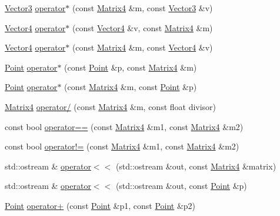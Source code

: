 \begin{DoxyCompactItemize}
\item 
\hyperlink{classprism_1_1_vector3}{Vector3} \hyperlink{namespaceprism_a04f1e6e0f84169fce23b236e0312d6a0}{operator$\ast$} (const \hyperlink{classprism_1_1_matrix4}{Matrix4} \&m, const \hyperlink{classprism_1_1_vector3}{Vector3} \&v)
\item 
\hyperlink{classprism_1_1_vector4}{Vector4} \hyperlink{namespaceprism_a5a10d8ea1e63b19d02bd294e4ebabb1b}{operator$\ast$} (const \hyperlink{classprism_1_1_vector4}{Vector4} \&v, const \hyperlink{classprism_1_1_matrix4}{Matrix4} \&m)
\item 
\hyperlink{classprism_1_1_vector4}{Vector4} \hyperlink{namespaceprism_ad125bd8304d577b6f879fb973f774eb8}{operator$\ast$} (const \hyperlink{classprism_1_1_matrix4}{Matrix4} \&m, const \hyperlink{classprism_1_1_vector4}{Vector4} \&v)
\item 
\hyperlink{classprism_1_1_point}{Point} \hyperlink{namespaceprism_a44373b8bda7131a90d04eef7e455ea6f}{operator$\ast$} (const \hyperlink{classprism_1_1_point}{Point} \&p, const \hyperlink{classprism_1_1_matrix4}{Matrix4} \&m)
\item 
\hyperlink{classprism_1_1_point}{Point} \hyperlink{namespaceprism_a82522932359d2381607cf1fe0c898011}{operator$\ast$} (const \hyperlink{classprism_1_1_matrix4}{Matrix4} \&m, const \hyperlink{classprism_1_1_point}{Point} \&p)
\item 
\hyperlink{classprism_1_1_matrix4}{Matrix4} \hyperlink{namespaceprism_a517b4bc9b0ccc23f79b744d93b540fa6}{operator/} (const \hyperlink{classprism_1_1_matrix4}{Matrix4} \&m, const float divisor)
\item 
const bool \hyperlink{namespaceprism_a8804ec2ab8dda9441d64e947f05e293c}{operator==} (const \hyperlink{classprism_1_1_matrix4}{Matrix4} \&m1, const \hyperlink{classprism_1_1_matrix4}{Matrix4} \&m2)
\item 
const bool \hyperlink{namespaceprism_a4d184994eec61a1511fc936a9facb69a}{operator!=} (const \hyperlink{classprism_1_1_matrix4}{Matrix4} \&m1, const \hyperlink{classprism_1_1_matrix4}{Matrix4} \&m2)
\item 
std\+::ostream \& \hyperlink{namespaceprism_ab65e15b3e601e0570beb49a11610c671}{operator$<$$<$} (std\+::ostream \&out, const \hyperlink{classprism_1_1_matrix4}{Matrix4} \&matrix)
\item 
std\+::ostream \& \hyperlink{namespaceprism_acb9fe7ab8ef5f1ee0338e3b057624393}{operator$<$$<$} (std\+::ostream \&out, const \hyperlink{classprism_1_1_point}{Point} \&p)
\item 
\hyperlink{classprism_1_1_point}{Point} \hyperlink{namespaceprism_a49e983b5c32c93114583309eda19dc2b}{operator+} (const \hyperlink{classprism_1_1_point}{Point} \&p1, const \hyperlink{classprism_1_1_point}{Point} \&p2)

\end{DoxyCompactItemize}

